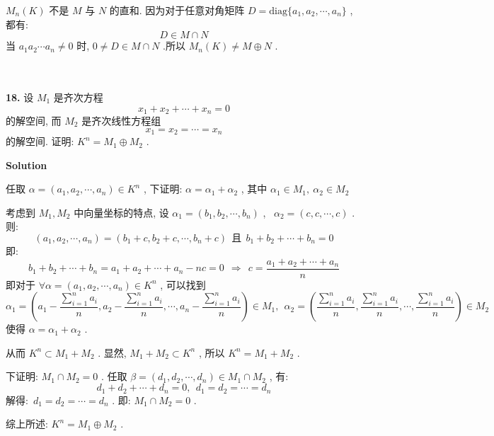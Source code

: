 \documentclass[11pt,a4paper,openany,oneside]{book}
\def\diag{\mathrm{diag}}
\newcommand\Solution{\noindent\textbf{\textsf{Solution}}\par\medskip}
\begin{document}
 $ M_n(K) $ 不是 $ M $ 与 $ N $ 的直和. 因为对于任意对角矩阵 $ D = \diag\{a_1, a_2, \cdots, a_n\} $ , 都有:
 $$  D \in M \cap N  $$ 
\hspace{1.7em} 当 $ a_1a_2\cdots a_n \neq 0 $ 时,  $ 0 \neq D \in M \cap N $ .所以 $ M_n(K) \neq M \oplus  N $ . \\  \\ \\



\begin{myexample}
	\textbf{18.} 
设 $ M_1 $ 是齐次方程
 $$  x_1 + x_2 + \cdots + x_n = 0  $$ 
的解空间, 而 $ M_2 $ 是齐次线性方程组
 $$  x_1 = x_2 = \cdots = x_n  $$ 
的解空间. 证明:  $  K^n = M_1 \oplus  M_2  $ .  \\  

\end{myexample}
\Solution 

任取 $ \alpha = (a_1, a_2, \cdots, a_n) \in K^n $ , 下证明:  $ \alpha = \alpha_1 + \alpha_2 $ , 其中  $ \alpha_1 \in M_1, \ \alpha_2 \in M_2 $  

考虑到 $ M_1, M_2 $ 中向量坐标的特点, 设 $ \alpha_1 = (b_1, b_2, \cdots, b_n) $ , \  $ \alpha_2 = (c, c, \cdots, c) $ . 则: 
 $$  (a_1, a_2, \cdots, a_n) = (b_1 + c, b_2 + c, \cdots, b_n + c) \ \ \text{且} \ \ b_1 + b_2 + \cdots + b_n = 0  $$ 
即: 
 $$  b_1 + b_2 + \cdots + b_n = a_1 + a_2 + \cdots + a_n - nc = 0 \ \ \Rightarrow \ \ c = \dfrac{a_1 + a_2 + \cdots + a_n}{n}  $$ 
即对于 $ \forall \alpha=(a_1, a_2, \cdots, a_n) \in K^n $ , 可以找到
 $$ \alpha_1 = \left(a_1 - \frac{\sum\limits_{i=1}^{n}a_i}{n}, a_2 -\frac{\sum\limits_{i=1}^{n}a_i}{n}, \cdots, a_n-\frac{\sum\limits_{i=1}^{n}a_i}{n} \right) \in M_1, \ \  \alpha_2 = \left(\frac{\sum\limits_{i=1}^{n}a_i}{n}, \frac{\sum\limits_{i=1}^{n}a_i}{n}, \cdots, \frac{\sum\limits_{i=1}^{n}a_i}{n} \right) \in M_2 $$ 
使得 $ \alpha = \alpha_1 + \alpha_2 $ . 

从而 $ K^n \subset M_1 + M_2 $ . 显然,  $ M_1 + M_2 \subset K^n $ , 所以  $ K^n = M_1 + M_2 $ .  

下证明:  $ M_1 \cap M_2 = 0 $ . 任取 $ \beta = (d_1, d_2, \cdots, d_n) \in M_1 \cap M_2 $ , 有:
 $$  d_1 + d_2 + \cdots + d_n = 0, \ \ d_1 = d_2 = \cdots = d_n  $$ 
解得:\  $ d_1 = d_2 = \cdots = d_n $ . 即:  $ M_1 \cap M_2 = 0 $ .

综上所述:  $ K^n = M_1 \oplus  M_2 $ .   \\  \\  \\ 
\end{document}
